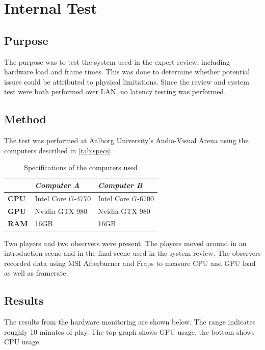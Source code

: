 \chapter{Internal Test}

\section*{Purpose}

The purpose was to test the system used in the expert review, including hardware load and frame times. This was done to determine whether potential issues could be attributed to physical limitations. Since the review and system test were both performed over LAN, no latency testing was performed.

\section*{Method}

The test was performed at Aalborg University's Audio-Visual Arena using the computers described in \autoref{tab:specs}. 

\begin{table}[H]
\centering
\begin{tabularx}{0.75\textwidth}{X X X}
\toprule
                     & \textit{Computer A} & \textit{Computer B} \\ \midrule \rowcolor{lightGrey}
\textbf{CPU}         & Intel Core i7-4770  & Intel Core i7-6700  \\

\textbf{GPU}         & Nvidia GTX 980      & Nvidia GTX 980    \\  \rowcolor{lightGrey}

\textbf{RAM} 		 & 16GB                & 16GB                 \\ \toprule
\end{tabularx}
\caption{Specifications of the computers used}
\label{tab:specs}
\end{table}

Two players and two observers were present. The players moved around in an introduction scene and in the final scene used in the system review. The observers recorded data using MSI Afterburner and Fraps to measure CPU and GPU load as well as framerate.

\section*{Results}
The results from the hardware monitoring are shown below. The range indicates roughly 10 minutes of play. The top graph shows GPU usage, the bottom shows CPU usage.

